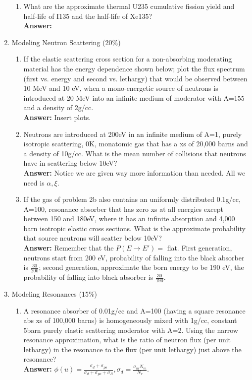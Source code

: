 \documentclass{school-22.211-notes}
\begin{document}
\begin{enumerate}
\begin{enumerate}
   \item What are the approximate thermal U235 cumulative fission yield and half-life of I135 and the half-life of Xe135? \\
     \textbf{Answer:} 
  \end{enumerate}

\item Modeling Neutron Scattering (20\%)
  \begin{enumerate}
  \item If the elastic scattering cross section for a non-absorbing moderating material has the energy dependence shown below; plot the flux spectrum (first vs. energy and second vs. lethargy) that would be observed between 10 MeV and 10 eV, when a mono-energetic source of neutrons is introduced at 20 MeV into an infinite medium of moderator with A=155 and a density of 2g/cc. \\
    \textbf{Answer:} Insert plots. 

  \item Neutrons are introduced at 200eV in an infinite medium of A=1, purely isotropic scattering, 0K, monatomic gas that has a xs of 20,000 barns and a density of 10g/cc. What is the mean number of collisions that neutrons have in scattering below 10eV? \\
    \textbf{Answer:} Notice we are given way more information than needed. All we need is $\alpha, \xi$. 

  \item If the gas of problem 2b also contains an uniformly distributed 0.1g/cc, A=100, resonance absorber that has zero xs at all energies except between 150 and 180eV, where it has an infinite absorption and 4,000 barn isotropic elastic cross sections. What is the approximate probability that source neutrons will scatter below 10eV? \\
    \textbf{Answer:} Remember that the $P(E\to E') = $ flat. First generation, neutrons start from 200 eV, probability of falling into the black absorber is $\frac{30}{200}$; second generation, approximate the born energy to be 190 eV, the probability of falling into black absorber is $\frac{30}{190}$. 
  \end{enumerate}

\item Modeling Resonances (15\%) 
  \begin{enumerate}
     \item A resonance absorber of 0.01g/cc and A=100 (having a square resonance abs xs of 100,000 barns) is homogeneously mixed with 1g/cc, constant 5barn purely elastic scattering moderator with A=2. Using the narrow resonance approximation, what is the ratio of neutron flux (per unit lethargy) in the resonance to the flux (per unit lethargy) just above the resonance? \\
    \textbf{Answer:} $\displaystyle \phi(u) = \frac{\sigma_d + \sigma_{po}}{\sigma_d + \sigma_{po} + \sigma_R}, \sigma_d = \frac{\sigma_m N_m}{N_r}$. 


\end{enumerate}
\end{enumerate}
\end{document}
